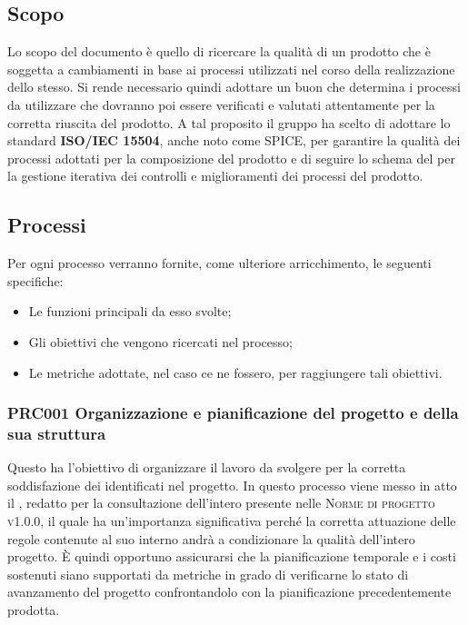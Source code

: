 \documentclass[../piano-di-qualifica.tex]{subfiles}
\begin{document}
\subsection{Scopo}%
\label{sub:scopo}
Lo scopo del documento è quello di ricercare la qualità di un prodotto che è soggetta a cambiamenti in base ai processi utilizzati nel corso della realizzazione dello stesso.
Si rende necessario quindi adottare un buon  che determina i processi da utilizzare che dovranno poi essere verificati e valutati attentamente per la corretta riuscita del prodotto.
A tal proposito il gruppo ha scelto di adottare lo standard \textbf{ISO/IEC 15504}, anche noto come SPICE, per garantire la qualità dei processi adottati per la composizione del prodotto e di seguire lo schema del  per la gestione iterativa dei controlli e miglioramenti dei processi del prodotto.

\subsection{Processi}%
\label{sub:processi}
Per ogni processo verranno fornite, come ulteriore arricchimento, le seguenti specifiche:
\begin{itemize}
    \item Le funzioni principali da esso svolte;
    \item Gli obiettivi che vengono ricercati nel processo;
    \item Le metriche adottate, nel caso ce ne fossero, per raggiungere tali obiettivi.
\end{itemize}

\subsubsection{PRC001 Organizzazione e pianificazione del progetto e della sua struttura}%
\label{sub:organizzazione_e_pianificazione_del_progetto_e_della_sua_struttura}
Questo  ha l'obiettivo di organizzare il lavoro da svolgere per la corretta soddisfazione dei  identificati nel progetto.
In questo processo viene messo in atto il , redatto per la consultazione dell'intero  presente nelle \textsc{Norme di progetto v1.0.0}, il quale ha un'importanza significativa perché la corretta attuazione delle regole contenute al suo interno andrà a condizionare la qualità dell'intero progetto.
È quindi opportuno assicurarsi che la pianificazione temporale e i costi sostenuti siano supportati da metriche in grado di verificarne lo stato di avanzamento del progetto confrontandolo con la pianificazione precedentemente prodotta.
\end{document}
